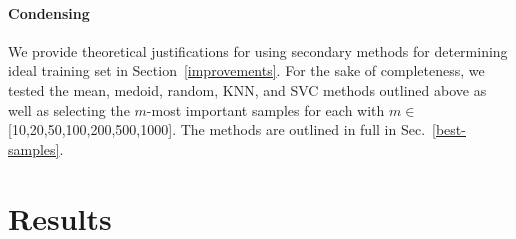 \documentclass{article}
\begin{document}
\paragraph{Condensing}
\label{condensing}
We provide theoretical justifications for using secondary methods for determining ideal training set in Section~\ref{improvements}. For the sake of completeness, we tested the mean, medoid, random, KNN, and SVC methods outlined above as well as selecting the $m$-most important samples for each with $m \in$ [10,20,50,100,200,500,1000]. The methods are outlined in full in Sec.~\ref{best-samples}.


\section{Results}
\label{results}


\end{document}
